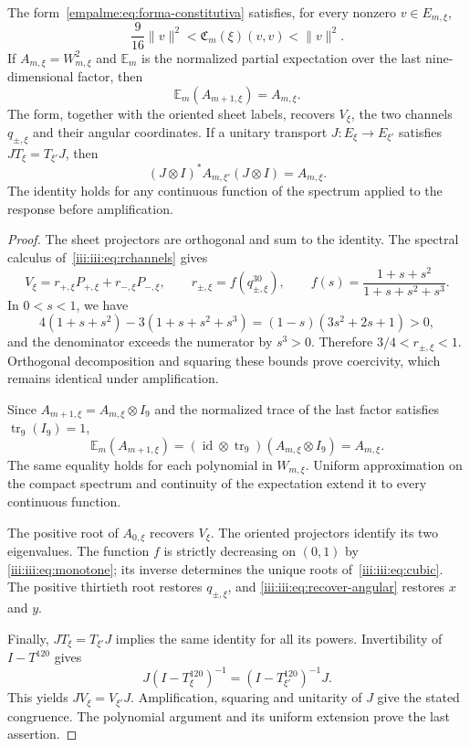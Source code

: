 \begin{proposition}
\label{empalme:prop:constitutiva-natural} The form~\eqref{empalme:eq:forma-constitutiva} satisfies, for every nonzero $v\in E_{m,\xi}$,
\[
 \frac9{16}\|v\|^2
 <\mathfrak C_m(\xi)(v,v)<\|v\|^2.
\]
If $A_{m,\xi}=W_{m,\xi}^{2}$ and $\mathbb E_m$ is the normalized partial expectation over the last nine-dimensional factor, then
\[
 \mathbb E_m(A_{m+1,\xi})=A_{m,\xi}.
\]
The form, together with the oriented sheet labels, recovers $V_\xi$, the two channels $q_{\pm,\xi}$ and their angular coordinates. If a unitary transport $J:E_\xi\to E_{\xi'}$ satisfies $JT_\xi=T_{\xi'}J$, then
\[
 (J\otimes I)^*A_{m,\xi'}(J\otimes I)=A_{m,\xi}.
\]
The identity holds for any continuous function of the spectrum applied to the response before amplification.
\end{proposition}

\begin{proof}
The sheet projectors are orthogonal and sum to the identity. The spectral calculus of~\eqref{iii:iii:eq:rchannels} gives
\[
 V_\xi=r_{+,\xi}P_{+,\xi}+r_{-,\xi}P_{-,\xi},\qquad
 r_{\pm,\xi}=f(q_{\pm,\xi}^{30}),\qquad
 f(s)=\frac{1+s+s^2}{1+s+s^2+s^3}.
\]
In $0<s<1$, we have
\[
 4(1+s+s^2)-3(1+s+s^2+s^3)
 =(1-s)(3s^2+2s+1)>0,
\]
and the denominator exceeds the numerator by $s^3>0$. Therefore $3/4<r_{\pm,\xi}<1$. Orthogonal decomposition and squaring these bounds prove coercivity, which remains identical under amplification.

Since $A_{m+1,\xi}=A_{m,\xi}\otimes I_9$ and the normalized trace of the last factor satisfies $\operatorname{tr}_9(I_9)=1$,
\[
 \mathbb E_m(A_{m+1,\xi})
 =(\operatorname{id}\otimes\operatorname{tr}_9)
 (A_{m,\xi}\otimes I_9)=A_{m,\xi}.
\]
The same equality holds for each polynomial in $W_{m,\xi}$. Uniform approximation on the compact spectrum and continuity of the expectation extend it to every continuous function.

The positive root of $A_{0,\xi}$ recovers $V_\xi$. The oriented projectors identify its two eigenvalues. The function $f$ is strictly decreasing on $(0,1)$ by \eqref{iii:iii:eq:monotone}; its inverse determines the unique roots of~\eqref{iii:iii:eq:cubic}. The positive thirtieth root restores $q_{\pm,\xi}$, and \eqref{iii:iii:eq:recover-angular} restores $x$ and $y$.

Finally, $JT_\xi=T_{\xi'}J$ implies the same identity for all its powers. Invertibility of $I-T^{120}$ gives
\[
 J(I-T_\xi^{120})^{-1}
 =(I-T_{\xi'}^{120})^{-1}J.
\]
This yields $JV_\xi=V_{\xi'}J$. Amplification, squaring and unitarity of $J$ give the stated congruence. The polynomial argument and its uniform extension prove the last assertion.
\end{proof}


